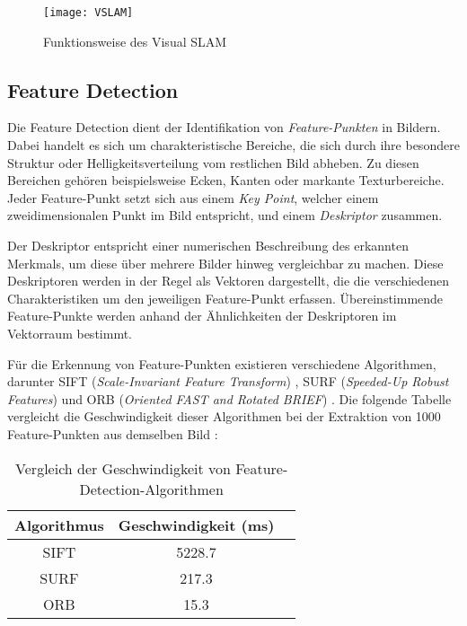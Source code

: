 \begin{figure}
    \centering
    \texttt{[image: VSLAM]}
    \caption{Funktionsweise des Visual SLAM \cite{tourani2022vSLAMTrends}\label{fig:VSLAM}}\par
\end{figure}

\subsection{Feature Detection}

Die Feature Detection dient der Identifikation von \emph{Feature-Punkten} in Bildern. Dabei handelt es sich um charakteristische Bereiche, die sich durch ihre besondere Struktur oder Helligkeitsverteilung vom restlichen Bild abheben. Zu diesen Bereichen gehören beispielsweise Ecken, Kanten oder markante Texturbereiche. Jeder Feature-Punkt setzt sich aus einem \emph{Key Point}, welcher einem zweidimensionalen Punkt im Bild entspricht, und einem \emph{Deskriptor} zusammen. \cite{gao2021vSLAM, szeliski2022computerVision}

Der Deskriptor entspricht einer numerischen Beschreibung des erkannten Merkmals, um diese über mehrere Bilder hinweg vergleichbar zu machen. Diese Deskriptoren werden in der Regel als Vektoren dargestellt, die die verschiedenen Charakteristiken um den jeweiligen Feature-Punkt erfassen. Übereinstimmende Feature-Punkte werden anhand der Ähnlichkeiten der Deskriptoren im Vektorraum bestimmt. \cite{gao2021vSLAM, szeliski2022computerVision}

Für die Erkennung von Feature-Punkten existieren verschiedene Algorithmen, darunter SIFT (\emph{Scale-Invariant Feature Transform}) \cite{lowe1999sift}, SURF (\emph{Speeded-Up Robust Features}) \cite{bay2006surf} und ORB (\emph{Oriented FAST and Rotated BRIEF}) \cite{rublee2011orb}. Die folgende Tabelle vergleicht die Geschwindigkeit dieser Algorithmen bei der Extraktion von 1000 Feature-Punkten aus demselben Bild \cite{gao2021vSLAM}:

\begin{table}[h]
    \centering
    \begin{tabular}{ccl} 
        \hline
        Algorithmus & Geschwindigkeit (ms) \\ 
        \hline
        SIFT & 5228.7 \\ 
        SURF & 217.3 \\ 
        ORB & 15.3 \\ 
        \hline
    \end{tabular}
    \caption{Vergleich der Geschwindigkeit von Feature-Detection-Algorithmen \cite{gao2021vSLAM}}
    \label{tab:AlgorithmComparison}
\end{table}

